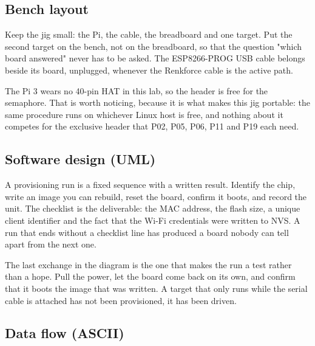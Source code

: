 \subsection*{Bench layout}


Keep the jig small: the Pi, the cable, the breadboard and one target. Put the second target on the bench, not on the breadboard, so that the question "which board answered" never has to be asked. The ESP8266-PROG USB cable belongs beside its board, unplugged, whenever the Renkforce cable is the active path.

The Pi 3 wears no 40-pin HAT in this lab, so the header is free for the semaphore. That is worth noticing, because it is what makes this jig portable: the same procedure runs on whichever Linux host is free, and nothing about it competes for the exclusive header that P02, P05, P06, P11 and P19 each need.

\subsection*{Software design (UML)}


A provisioning run is a fixed sequence with a written result. Identify the chip, write an image you can rebuild, reset the board, confirm it boots, and record the unit. The checklist is the deliverable: the MAC address, the flash size, a unique client identifier and the fact that the Wi-Fi credentials were written to NVS. A run that ends without a checklist line has produced a board nobody can tell apart from the next one.

The last exchange in the diagram is the one that makes the run a test rather than a hope. Pull the power, let the board come back on its own, and confirm that it boots the image that was written. A target that only runs while the serial cable is attached has not been provisioned, it has been driven.

\subsection*{Data flow (ASCII)}

